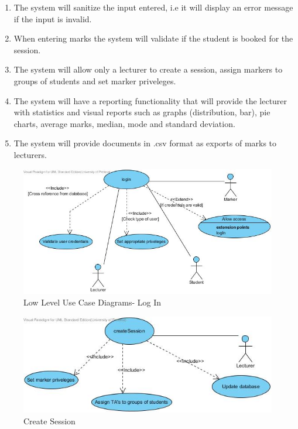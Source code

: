 \documentclass[a4paper]{article}
\begin{document}
\begin{enumerate}
		\item The system will sanitize the input entered, i.e it will display an error message if the input is invalid.
		\item When entering marks the system will validate if the student is booked for the session.
		\item The system will allow only a lecturer to create a session, assign markers to groups of students and set marker priveleges.
		\item The system will have a reporting functionality that will provide the lecturer with statistics and visual reports such as graphs (distribution, bar), pie charts, average marks, median, mode and standard deviation. 
		\item The system will provide documents in .csv format as exports of marks to lecturers.
		
		\end{enumerate}
			\begin{figure}[H]
				\centering
				\includegraphics[width=1\textwidth]{logIn}
				\caption{Low Level Use Case Diagrams- Log In}
			\end{figure}
			\begin{figure}[H]
				\centering
				\includegraphics[width=1\textwidth]{createSession}
				\caption{Create Session}
			\end{figure}
\end{document}
